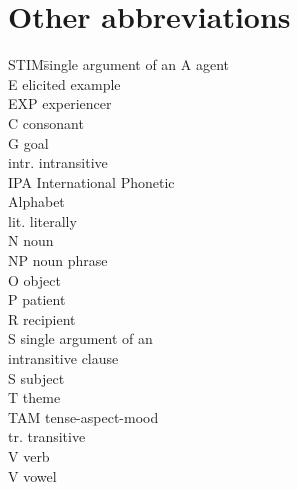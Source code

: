 \section*{Other abbreviations}
	\begin{multicols}{2}
		\begin{tabbing}
		  STIM\hspace{\tabcolsep}\= single argument of an\kill
			A 		\>	agent\\
			E	\>	elicited example\\
			EXP 	\>	experiencer\\
			C		\>  consonant\\
			G 		\>	goal\\
			intr. 	\>	intransitive\\
			IPA 	\>	International Phonetic\\
			{}		\>	Alphabet\\
			lit. 	\>	literally\\
			N 		\>	noun\\
			NP 		\>	noun phrase\\
			O		\>	object\\
			P 		\>	patient\\
			R 		\>	recipient\\
			S 		\>	single argument of an\\
			{}		\>	intransitive clause\\
			S		\>	subject\\
			T 		\>	theme\\
			TAM 	\>	tense-aspect-mood\\
			tr. 	\>	transitive\\
			V 		\>	verb\\
			V		\> 	vowel\\
		\end{tabbing}
	\end{multicols}

